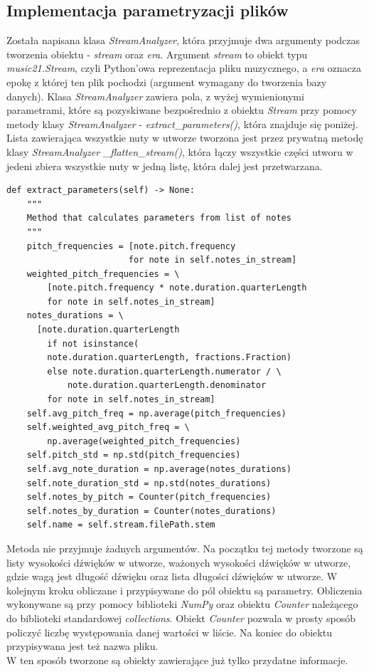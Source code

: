 \documentclass[printmode, eng]{mgr}
\newcommand\tab[1][1cm]{\hspace*{#1}}
\begin{document}
\subsection{Implementacja parametryzacji plików}
\tab Została napisana klasa \textit{StreamAnalyzer}, która przyjmuje dwa argumenty podczas tworzenia obiektu - \textit{stream} oraz \textit{era}. Argument \textit{stream} to obiekt typu \textit{music21.Stream}, czyli Python'owa reprezentacja pliku muzycznego, a \textit{era} oznacza epokę z której ten plik pochodzi (argument wymagany do tworzenia bazy danych). Klasa \textit{StreamAnalyzer} zawiera pola, z wyżej wymienionymi parametrami, które są pozyskiwane bezpośrednio z obiektu \textit{Stream} przy pomocy metody klasy \textit{StreamAnalyzer} - \textit{extract\_parameters()}, która znajduje się poniżej.\\
\tab Lista zawierająca wszystkie nuty w utworze tworzona jest przez prywatną metodę klasy \textit{StreamAnalyzer} \textit{\_flatten\_stream()}, która łączy wszystkie części utworu w jeden\linebreak i zbiera wszystkie nuty w jedną listę, która dalej jest przetwarzana.
\begin{lstlisting}
def extract_parameters(self) -> None:
    """
    Method that calculates parameters from list of notes
    """
    pitch_frequencies = [note.pitch.frequency
                        for note in self.notes_in_stream]
    weighted_pitch_frequencies = \
    	[note.pitch.frequency * note.duration.quarterLength
        for note in self.notes_in_stream]
    notes_durations = \
      [note.duration.quarterLength
        if not isinstance(
        note.duration.quarterLength, fractions.Fraction)
        else note.duration.quarterLength.numerator / \
            note.duration.quarterLength.denominator
        for note in self.notes_in_stream]
    self.avg_pitch_freq = np.average(pitch_frequencies)
    self.weighted_avg_pitch_freq = \
        np.average(weighted_pitch_frequencies)
    self.pitch_std = np.std(pitch_frequencies)
    self.avg_note_duration = np.average(notes_durations)
    self.note_duration_std = np.std(notes_durations)
    self.notes_by_pitch = Counter(pitch_frequencies)
    self.notes_by_duration = Counter(notes_durations)
    self.name = self.stream.filePath.stem
\end{lstlisting}
\tab Metoda nie przyjmuje żadnych argumentów. Na początku tej metody tworzone są listy wysokości dźwięków w utworze, ważonych wysokości dźwięków w utworze, gdzie wagą jest długość dźwięku oraz lista długości dźwięków w utworze. W kolejnym kroku obliczane i przypisywane do pól obiektu są parametry. Obliczenia wykonywane są przy pomocy biblioteki \textit{NumPy} oraz obiektu \textit{Counter} należącego do biblioteki standardowej \textit{collections}. Obiekt \textit{Counter} pozwala w prosty sposób policzyć liczbę występowania danej wartości w liście. Na koniec do obiektu przypisywana jest też nazwa pliku.\\
\tab W ten sposób tworzone są obiekty zawierające już tylko przydatne informacje. 
\end{document}
